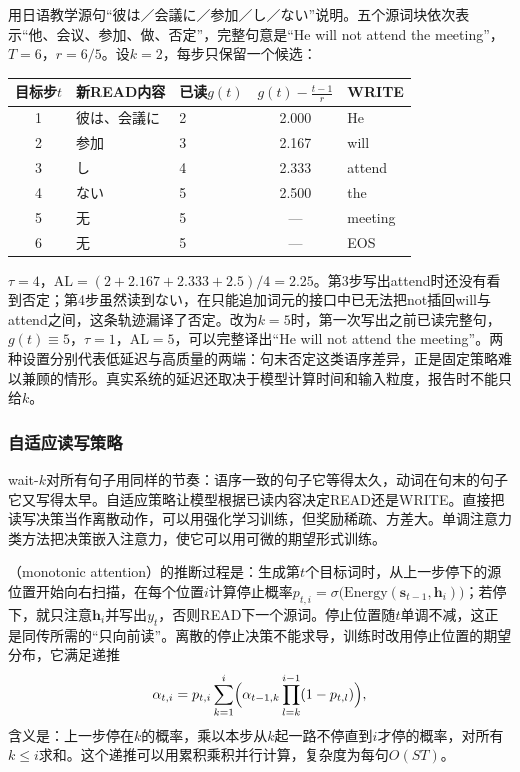 用日语教学源句“彼は／会議に／参加／し／ない”说明。五个源词块依次表示“他、会议、参加、做、否定”，完整句意是“He will not attend the meeting”，$T=6$，$r=6/5$。设$k=2$，每步只保留一个候选：
\begin{center}
  \begin{tabular}{@{}cllcl@{}}
    \toprule
    目标步$t$ & 新READ内容 & 已读$g(t)$ & $g(t)-\frac{t-1}{r}$ & WRITE\\
    \midrule
    1 & 彼は、会議に & 2 & 2.000 & He\\
    2 & 参加 & 3 & 2.167 & will\\
    3 & し & 4 & 2.333 & attend\\
    4 & ない & 5 & 2.500 & the\\
    5 & 无 & 5 & — & meeting\\
    6 & 无 & 5 & — & EOS\\
    \bottomrule
  \end{tabular}
\end{center}
$\tau=4$，$\mathrm{AL}=(2+2.167+2.333+2.5)/4=2.25$。第3步写出attend时还没有看到否定；第4步虽然读到ない，在只能追加词元的接口中已无法把not插回will与attend之间，这条轨迹漏译了否定。改为$k=5$时，第一次写出之前已读完整句，$g(t)\equiv5$，$\tau=1$，$\mathrm{AL}=5$，可以完整译出“He will not attend the meeting”。两种设置分别代表低延迟与高质量的两端：句末否定这类语序差异，正是固定策略难以兼顾的情形。真实系统的延迟还取决于模型计算时间和输入粒度，报告时不能只给$k$。

\subsubsection{自适应读写策略}
\label{sec:nlp-generation-adaptive-policy}

wait-$k$对所有句子用同样的节奏：语序一致的句子它等得太久，动词在句末的句子它又写得太早。自适应策略让模型根据已读内容决定READ还是WRITE。直接把读写决策当作离散动作，可以用强化学习训练，但奖励稀疏、方差大。单调注意力类方法把决策嵌入注意力，使它可以用可微的期望形式训练。

（monotonic attention）的推断过程是：生成第$t$个目标词时，从上一步停下的源位置开始向右扫描，在每个位置$i$计算停止概率$p_{t,i}=\sigma\bigl(\mathrm{Energy}(\bm s_{t-1},\bm h_i)\bigr)$；若停下，就只注意$\bm h_i$并写出$y_t$，否则READ下一个源词。停止位置随$t$单调不减，这正是同传所需的“只向前读”。离散的停止决策不能求导，训练时改用停止位置的期望分布，它满足递推
\begin{equation}
  \alpha_{t,i}=p_{t,i}\sum_{k=1}^{i}\Bigl(\alpha_{t-1,k}\prod_{l=k}^{i-1}(1-p_{t,l})\Bigr),
  \label{eq:nlp-generation-monotonic-attention}
\end{equation}
含义是：上一步停在$k$的概率，乘以本步从$k$起一路不停直到$i$才停的概率，对所有$k\le i$求和。这个递推可以用累积乘积并行计算，复杂度为每句$O(ST)$。

